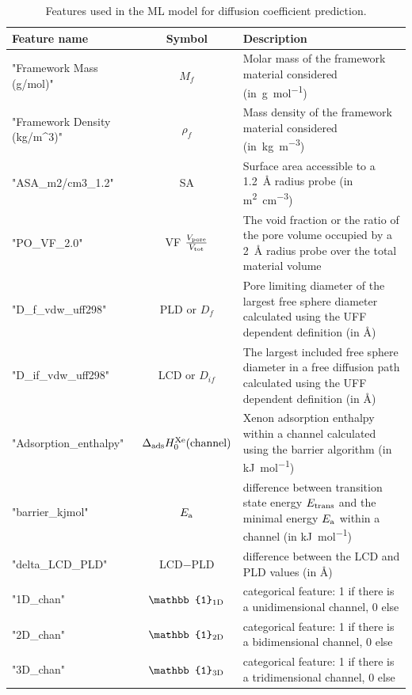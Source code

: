 \documentclass[main]{subfiles}
\begin{document}
\begin{table}[ht]
  \setlength{\extrarowheight}{1pt}
  \centering
  \begin{tabular}{|l|c|m{8cm}|}
  \hline
    Feature name  &  Symbol   &   Description\\
  \hline
      "Framework Mass (g/mol)" &   $M_f$ &   Molar mass of the framework material considered (in~\si{\g\per\mol}) \\
      "Framework Density (kg/m\textasciicircum{}3)" &   $\rho_f$ &   Mass density of the framework material considered (in~\si{\kg\per\cubic\m})  \\
      "ASA\_m2/cm3\_1.2" &   SA &   Surface area accessible to a \SI{1.2}{\angstrom} radius probe (in \si{\square\m\per\cubic\cm})  \\
      "PO\_VF\_2.0" &  VF $\tfrac{V_{\text{pore}}}{V_{\text{tot}}}$ &  The void fraction or the ratio of the pore volume occupied by a \SI{2}{\angstrom} radius probe over the total material volume  \\
      "D\_f\_vdw\_uff298" &   PLD or $D_f$  &   Pore limiting diameter of the largest free sphere diameter calculated using the UFF dependent definition (in \si{\angstrom}) \\
      "D\_if\_vdw\_uff298" &   LCD or $D_{if}$ &   The largest included free sphere diameter in a free diffusion path calculated using the UFF dependent definition (in \si{\angstrom}) \\
      "Adsorption\_enthalpy" &   $\Delta_{\text{ads}}H_0^{\text{Xe}}(\text{channel})$  &   Xenon adsorption enthalpy within a channel calculated using the barrier algorithm (in \si{\kJ\per\mol}) \\
      "barrier\_kjmol" &   $E_{\text{a}}$  &   difference between transition state energy $E_{\text{trans}}$ and the minimal energy $E_{\text{a}}$ within a channel (in \si{\kJ\per\mol}) \\
      "delta\_LCD\_PLD" &   LCD$-$PLD  &   difference between the LCD and PLD values (in \si{\angstrom}) \\
      "1D\_chan" &  $\mathbb{1}\e{1D}$   &   categorical feature: 1 if there is a unidimensional channel, 0 else \\
      "2D\_chan" &  $\mathbb{1}\e{2D}$   &   categorical feature: 1 if there is a bidimensional channel, 0 else \\
      "3D\_chan" &  $\mathbb{1}\e{3D}$   &   categorical feature: 1 if there is a tridimensional channel, 0 else \\
    \hline
  \end{tabular}
  \caption{ Features used in the ML model for diffusion coefficient prediction. }\label{Table:feat_diff}
\end{table}
\end{document}
